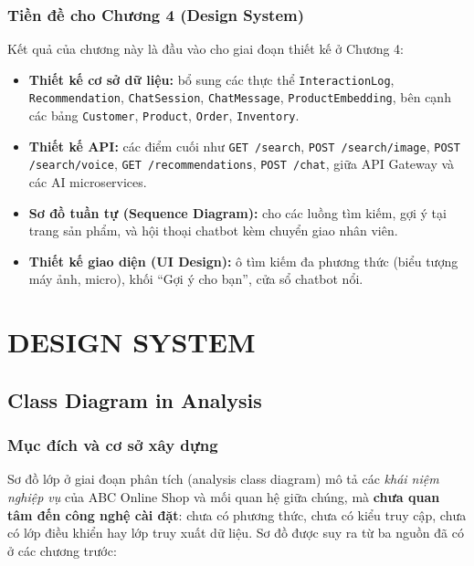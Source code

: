 \documentclass[12pt,a4paper,oneside]{report}
\begin{document}
\subsection{Tiền đề cho Chương 4 (Design System)}

Kết quả của chương này là đầu vào cho giai đoạn thiết kế ở Chương 4:

\begin{itemize}
  \item \textbf{Thiết kế cơ sở dữ liệu:} bổ sung các thực thể \texttt{InteractionLog}, \texttt{Recommendation}, \texttt{ChatSession}, \texttt{ChatMessage}, \texttt{ProductEmbedding}, bên cạnh các bảng \texttt{Customer}, \texttt{Product}, \texttt{Order}, \texttt{Inventory}.
  \item \textbf{Thiết kế API:} các điểm cuối như \texttt{GET /search}, \texttt{POST /search/image}, \texttt{POST /search/voice}, \texttt{GET /recommendations}, \texttt{POST /chat}, giữa API Gateway và các AI microservices.
  \item \textbf{Sơ đồ tuần tự (Sequence Diagram):} cho các luồng tìm kiếm, gợi ý tại trang sản phẩm, và hội thoại chatbot kèm chuyển giao nhân viên.
  \item \textbf{Thiết kế giao diện (UI Design):} ô tìm kiếm đa phương thức (biểu tượng máy ảnh, micro), khối ``Gợi ý cho bạn'', cửa sổ chatbot nổi.
\end{itemize}



\chapter{DESIGN SYSTEM}

\section{Class Diagram in Analysis}

\subsection{Mục đích và cơ sở xây dựng}

Sơ đồ lớp ở giai đoạn phân tích (analysis class diagram) mô tả các \emph{khái niệm nghiệp vụ} của ABC Online Shop và mối quan hệ giữa chúng, mà \textbf{chưa quan tâm đến công nghệ cài đặt}: chưa có phương thức, chưa có kiểu truy cập, chưa có lớp điều khiển hay lớp truy xuất dữ liệu. Sơ đồ được suy ra từ ba nguồn đã có ở các chương trước:
\end{document}
